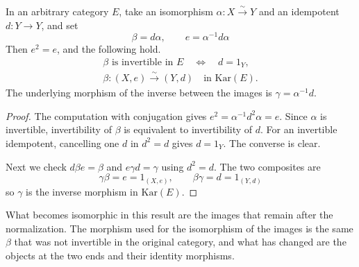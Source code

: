 \begin{theorem}\label{thm:6.12}

In an arbitrary category $E$, take an isomorphism $\alpha:X\xrightarrow{\sim}Y$ and an
idempotent $d:Y\to Y$, and set
\begin{equation*}
\beta=d\alpha,\qquad e=\alpha^{-1}d\alpha
\tag{6.12}\label{eq:6.12}
\end{equation*}
Then $e^2=e$, and the following hold.
\begin{equation*}
\begin{gathered}
\beta\text{ is invertible in }E\text{}
\quad\Longleftrightarrow\quad d=1_Y,\\
\beta:(X,e)\xrightarrow{\sim}(Y,d)
\quad\text{in }\mathrm{Kar}(E).
\end{gathered}
\tag{6.13}\label{eq:6.13}
\end{equation*}
The underlying morphism of the inverse between the images is $\gamma=\alpha^{-1}d$.

\end{theorem}

\begin{proof}

The computation with conjugation gives $e^2=\alpha^{-1}d^2\alpha=e$.
Since $\alpha$ is invertible, invertibility of $\beta$ is equivalent to invertibility of
$d$.
For an invertible idempotent, cancelling one $d$ in $d^2=d$ gives $d=1_Y$.
The converse is clear.

Next we check $d\beta e=\beta$ and $e\gamma d=\gamma$ using $d^2=d$.
The two composites are
\begin{equation*}
\gamma\beta=e=1_{(X,e)},\qquad
\beta\gamma=d=1_{(Y,d)}
\tag{6.14}\label{eq:6.14}
\end{equation*}
so $\gamma$ is the inverse morphism in $\mathrm{Kar}(E)$.

\end{proof}

What becomes isomorphic in this result are the images that remain after the normalization.
The morphism used for the isomorphism of the images is the same $\beta$ that was not
invertible in the original category, and what has changed are the objects at the two ends
and their identity morphisms.

